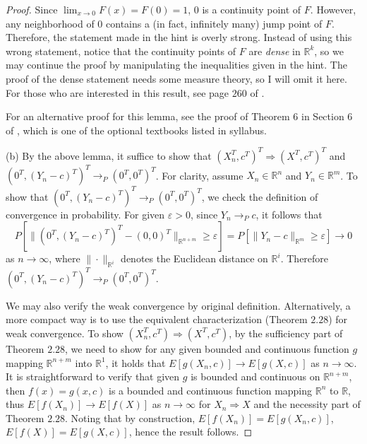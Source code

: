 \documentclass{article}
\newcommand{\eps}{\varepsilon}
\newcommand{\real}{\mathbb{R}}
\theoremstyle{definition}
\theoremstyle{plain}
\theoremstyle{remark}
\begin{document}
\begin{description}
\begin{proof}
Since $\lim_{x \to 0} F(x) = F(0) = 1$, $0$ is a continuity point of $F$. However, any neighborhood of $0$ contains a (in fact, infinitely many) jump point of $F$. Therefore, the statement made in the hint is overly strong. Instead of using this wrong statement, notice that the continuity points of $F$ are \emph{dense} in $\real^k$, so we may continue the proof by manipulating the inequalities given in the hint. The proof of the dense statement needs some measure theory, so I will omit it here. For those who are interested in this result, see page $260$ of \cite{billingsley95}.

For an alternative proof for this lemma, see the proof of Theorem $6$ in Section $6$ of \cite{ferguson1996}, which is one of the optional textbooks listed in syllabus.

\item[(b)] By the above lemma, it suffice to show that $(X_n^T, c^T)^T \Rightarrow (X^T, c^T)^T$ and $(0^T, (Y_n - c)^T)^T \to_P (0^T, 0^T)^T$. For clarity, assume $X_n \in \real^n$ and $Y_n \in \real^m$. To show that $(0^T, (Y_n - c)^T)^T \to_P (0^T, 0^T)^T$, we check the definition of convergence in probability. For given $\eps > 0$, since $Y_n \to_P c$, it follows that
$$P[\|(0^T, (Y_n - c)^T)^T - (0, 0)^T\|_{\real^{n + m}} \geq \eps] = P[\|Y_n - c\|_{\real^m} \geq \eps] \to 0$$
as $n \to \infty$, where $\|\cdot\|_{\real^i}$ denotes the Euclidean distance on $\real^i$. Therefore $(0^T, (Y_n - c)^T)^T \to_P (0^T, 0^T)^T$.

We may also verify the weak convergence by original definition. Alternatively, a more compact way is to use the equivalent characterization (Theorem $2.28$) for weak convergence. To show $(X_n^T, c^T) \Rightarrow (X^T, c^T)$, by the sufficiency part of Theorem $2.28$, we need to show for any given bounded and continuous function $g$ mapping $\real^{n + m}$ into $\real^1$, it holds that $E[g(X_n, c)] \to E[g(X, c)]$ as $n \to \infty$. It is straightforward to verify that given $g$ is bounded and continuous on $\real^{n + m}$, then $f(x) = g(x, c)$ is a bounded and continuous function mapping $\real^n$ to $\real$, thus $E[f(X_n)] \to E[f(X)]$ as $n \to \infty$ for $X_n \Rightarrow X$ and the necessity part of Theorem $2.28$. Noting that by construction, $E[f(X_n)] = E[g(X_n, c)]$, $E[f(X)] = E[g(X, c)]$, hence the result follows.
\end{proof}

\begin{comment}
\item[3.1]
\begin{description}
\item[(a)] Trivial.


\end{comment}
\end{description}
\end{document}
